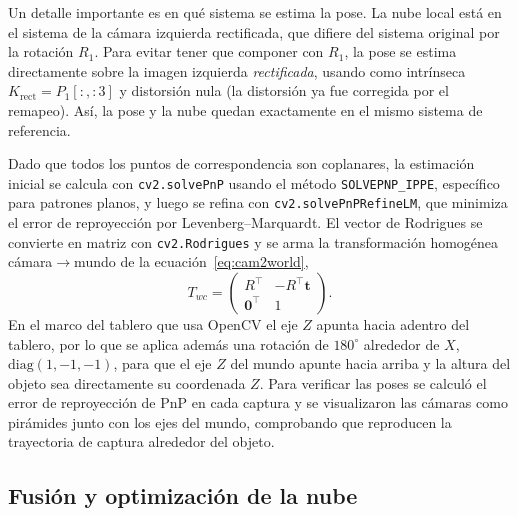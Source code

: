 \documentclass[conference]{IEEEtran}
\begin{document}
Un detalle importante es en qué sistema se estima la pose. La nube local está
en el sistema de la cámara izquierda rectificada, que difiere del sistema
original por la rotación $R_1$. Para evitar tener que componer con $R_1$, la
pose se estima directamente sobre la imagen izquierda \emph{rectificada},
usando como intrínseca $K_{\text{rect}}=P_1[:, :3]$ y distorsión nula (la
distorsión ya fue corregida por el remapeo). Así, la pose y la nube quedan
exactamente en el mismo sistema de referencia.

Dado que todos los puntos de correspondencia son coplanares, la estimación
inicial se calcula con \texttt{cv2.solvePnP} usando el método
\texttt{SOLVEPNP\_IPPE}, específico para patrones planos, y luego se refina
con \texttt{cv2.solvePnPRefineLM}, que minimiza el error de reproyección por
Levenberg--Marquardt. El vector de Rodrigues se convierte en matriz con
\texttt{cv2.Rodrigues} y se arma la transformación homogénea cámara$\to$mundo
de la ecuación~\eqref{eq:cam2world},
\begin{equation}
  T_{wc}=\begin{pmatrix} R^\top & -R^\top\mathbf{t}\\ \mathbf{0}^\top & 1\end{pmatrix}.
\end{equation}
En el marco del tablero que usa OpenCV el eje $Z$ apunta hacia adentro del
tablero, por lo que se aplica además una rotación de $180^\circ$ alrededor de
$X$, $\mathrm{diag}(1,-1,-1)$, para que el eje $Z$ del mundo apunte hacia
arriba y la altura del objeto sea directamente su coordenada $Z$. Para
verificar las poses se calculó el error de reproyección de PnP en cada
captura y se visualizaron las cámaras como pirámides junto con los ejes del
mundo, comprobando que reproducen la trayectoria de captura alrededor del
objeto.

\subsection{Fusión y optimización de la nube}
\end{document}
